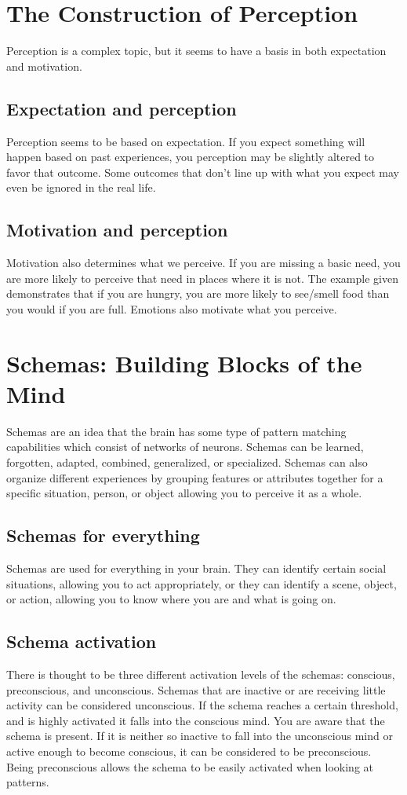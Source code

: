 \documentclass{book}
\begin{document}
\section{The Construction of Perception}
Perception is a complex topic, but it seems to have a basis in both expectation and motivation.

\subsection{Expectation and perception}
Perception seems to be based on expectation. If you expect something will happen based on past experiences, you perception may be slightly altered to favor that outcome. Some outcomes that don't line up with what you expect may even be ignored in the real life.

\subsection{Motivation and perception}
Motivation also determines what we perceive. If you are missing a basic need, you are more likely to perceive that need in places where it is not. The example given demonstrates that if you are hungry, you are more likely to see/smell food than you would if you are full. Emotions also motivate what you perceive. 

\section{Schemas: Building Blocks of the Mind}
Schemas are an idea that the brain has some type of pattern matching capabilities which consist of networks of neurons. Schemas can be learned, forgotten, adapted, combined, generalized, or specialized. Schemas can also organize different experiences by grouping features or attributes together for a specific situation, person, or object allowing you to perceive it as a whole.

\subsection{Schemas for everything}
Schemas are used for everything in your brain. They can identify certain social situations, allowing you to act appropriately, or they can identify a scene, object, or action, allowing you to know where you are and what is going on.

\subsection{Schema activation}
There is thought to be three different activation levels of the schemas: conscious, preconscious, and unconscious. Schemas that are inactive or are receiving little activity can be considered unconscious. If the schema reaches a certain threshold, and is highly activated it falls into the conscious mind. You are aware that the schema is present. If it is neither so inactive to fall into the unconscious mind or active enough to become conscious, it can be considered to be preconscious. Being preconscious allows the schema to be easily activated when looking at patterns. 
\end{document}
